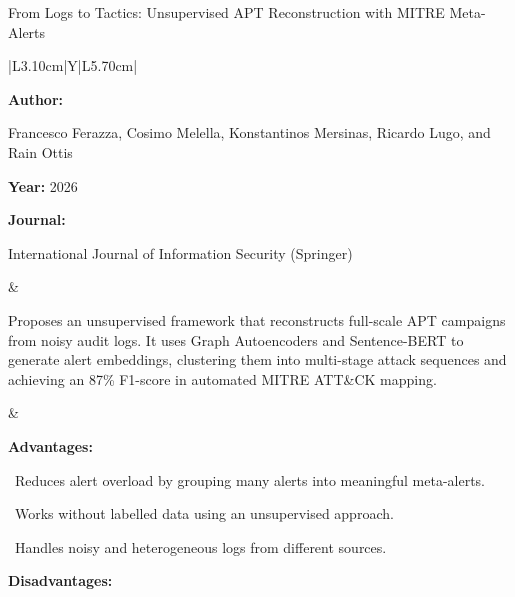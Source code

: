 \begin{frame}[t]{From Logs to Tactics: Unsupervised APT Reconstruction with MITRE Meta-Alerts}
\vspace{-0.30em}
{\footnotesize\setlength{\tabcolsep}{3.5pt}\renewcommand{\arraystretch}{1.10}
\begin{tabularx}{\textwidth}{|L{3.10cm}|Y|L{5.70cm}|}
\hline\lrhdr\hline
\begin{minipage}[t]{\linewidth}\fontsize{7.2pt}{9.2pt}\raggedright\selectfont
\textbf{Author:}\par
Francesco Ferazza, Cosimo Melella, Konstantinos Mersinas, Ricardo Lugo, and Rain Ottis\par\vspace{4pt}
\textbf{Year:} 2026\par\vspace{4pt}
\textbf{Journal:}\par
International Journal of Information Security (Springer)\par\vspace{4pt}
\end{minipage}
&
\begin{minipage}[t]{\linewidth}\fontsize{7.2pt}{9.2pt}\raggedright\selectfont
Proposes an unsupervised framework that reconstructs full-scale APT campaigns from noisy audit logs. It uses Graph Autoencoders and Sentence-BERT to generate alert embeddings, clustering them into multi-stage attack sequences and achieving an 87\% F1-score in automated MITRE ATT\&CK mapping.\par\vspace{4pt}
\end{minipage}
&
\begin{minipage}[t]{\linewidth}\fontsize{6.8pt}{8.4pt}\raggedright\selectfont
\textcolor{strengthGreen}{\textbf{Advantages:}}\par\vspace{1.3pt}
\textbullet~Reduces alert overload by grouping many alerts into meaningful meta-alerts.\par\vspace{1.8pt}\textbullet~Works without labelled data using an unsupervised approach.\par\vspace{1.8pt}\textbullet~Handles noisy and heterogeneous logs from different sources.\par\vspace{3.2pt}
\textcolor{limitRed}{\textbf{Disadvantages:}}\par\vspace{1.3pt}

\end{minipage}
\end{tabularx}}
\end{frame}
